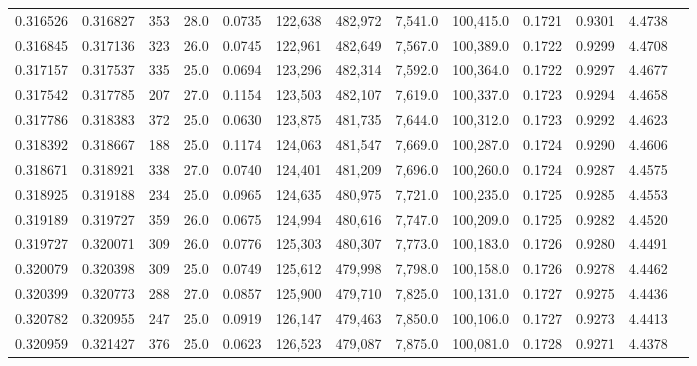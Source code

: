 \begin{tabular}{rrrrrrrrrrrrr}
0.316526 & 0.316827 &   353 & 28.0 &                                     0.0735 & 122,638 & 482,972 &   7,541.0 & 100,415.0 & 0.1721 & 0.9301 & 4.4738 \\
0.316845 & 0.317136 &   323 & 26.0 &                                     0.0745 & 122,961 & 482,649 &   7,567.0 & 100,389.0 & 0.1722 & 0.9299 & 4.4708 \\
0.317157 & 0.317537 &   335 & 25.0 &                                     0.0694 & 123,296 & 482,314 &   7,592.0 & 100,364.0 & 0.1722 & 0.9297 & 4.4677 \\
0.317542 & 0.317785 &   207 & 27.0 &                                     0.1154 & 123,503 & 482,107 &   7,619.0 & 100,337.0 & 0.1723 & 0.9294 & 4.4658 \\
0.317786 & 0.318383 &   372 & 25.0 &                                     0.0630 & 123,875 & 481,735 &   7,644.0 & 100,312.0 & 0.1723 & 0.9292 & 4.4623 \\
0.318392 & 0.318667 &   188 & 25.0 &                                     0.1174 & 124,063 & 481,547 &   7,669.0 & 100,287.0 & 0.1724 & 0.9290 & 4.4606 \\
0.318671 & 0.318921 &   338 & 27.0 &                                     0.0740 & 124,401 & 481,209 &   7,696.0 & 100,260.0 & 0.1724 & 0.9287 & 4.4575 \\
0.318925 & 0.319188 &   234 & 25.0 &                                     0.0965 & 124,635 & 480,975 &   7,721.0 & 100,235.0 & 0.1725 & 0.9285 & 4.4553 \\
0.319189 & 0.319727 &   359 & 26.0 &                                     0.0675 & 124,994 & 480,616 &   7,747.0 & 100,209.0 & 0.1725 & 0.9282 & 4.4520 \\
0.319727 & 0.320071 &   309 & 26.0 &                                     0.0776 & 125,303 & 480,307 &   7,773.0 & 100,183.0 & 0.1726 & 0.9280 & 4.4491 \\
0.320079 & 0.320398 &   309 & 25.0 &                                     0.0749 & 125,612 & 479,998 &   7,798.0 & 100,158.0 & 0.1726 & 0.9278 & 4.4462 \\
0.320399 & 0.320773 &   288 & 27.0 &                                     0.0857 & 125,900 & 479,710 &   7,825.0 & 100,131.0 & 0.1727 & 0.9275 & 4.4436 \\
0.320782 & 0.320955 &   247 & 25.0 &                                     0.0919 & 126,147 & 479,463 &   7,850.0 & 100,106.0 & 0.1727 & 0.9273 & 4.4413 \\
0.320959 & 0.321427 &   376 & 25.0 &                                     0.0623 & 126,523 & 479,087 &   7,875.0 & 100,081.0 & 0.1728 & 0.9271 & 4.4378 \\

\end{tabular}
